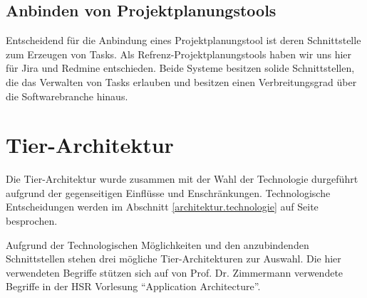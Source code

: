 		
		\subsection{Anbinden von Projektplanungstools}
			Entscheidend für die Anbindung eines Projektplanungstool ist deren Schnittstelle zum Erzeugen von Tasks. 
			Als Refrenz-Projektplanungstools haben wir uns hier für Jira und Redmine entschieden.
			Beide Systeme besitzen solide Schnittstellen,
			die das Verwalten von Tasks erlauben 
			und besitzen einen Verbreitungsgrad über die Softwarebranche hinaus.
		

	\section{Tier-Architektur}
		Die Tier-Architektur wurde zusammen mit der Wahl der Technologie durgeführt aufgrund der gegenseitigen Einflüsse und Enschränkungen.
		Technologische Entscheidungen werden im Abschnitt \ref{architektur.technologie} auf 
Seite \pageref{architektur.technologie} besprochen.
		
		Aufgrund der Technologischen Möglichkeiten und den anzubindenden Schnittstellen stehen drei mögliche Tier-Architekturen zur Auswahl.
		Die hier verwendeten Begriffe stützen sich auf von Prof. Dr. Zimmermann verwendete Begriffe in der HSR Vorlesung "`Application Architecture"'\cite{prof._dr._zimmerman_layers_2014}.		
		
